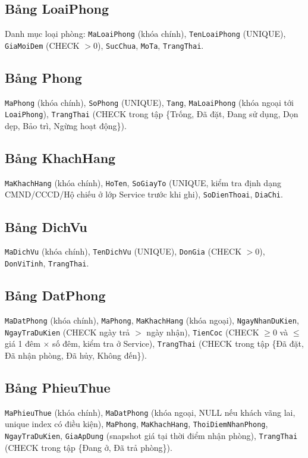 \documentclass[14pt]{report}
\begin{document}
\subsection{Bảng LoaiPhong}
Danh mục loại phòng: \texttt{MaLoaiPhong} (khóa chính), \texttt{TenLoaiPhong} (UNIQUE), \texttt{GiaMoiDem} (CHECK $>0$), \texttt{SucChua}, \texttt{MoTa}, \texttt{TrangThai}.

\subsection{Bảng Phong}
\texttt{MaPhong} (khóa chính), \texttt{SoPhong} (UNIQUE), \texttt{Tang}, \texttt{MaLoaiPhong} (khóa ngoại tới \texttt{LoaiPhong}), \texttt{TrangThai} (CHECK trong tập \{Trống, Đã đặt, Đang sử dụng, Dọn dẹp, Bảo trì, Ngừng hoạt động\}).

\subsection{Bảng KhachHang}
\texttt{MaKhachHang} (khóa chính), \texttt{HoTen}, \texttt{SoGiayTo} (UNIQUE, kiểm tra định dạng CMND/CCCD/Hộ chiếu ở lớp Service trước khi ghi), \texttt{SoDienThoai}, \texttt{DiaChi}.

\subsection{Bảng DichVu}
\texttt{MaDichVu} (khóa chính), \texttt{TenDichVu} (UNIQUE), \texttt{DonGia} (CHECK $>0$), \texttt{DonViTinh}, \texttt{TrangThai}.

\subsection{Bảng DatPhong}
\texttt{MaDatPhong} (khóa chính), \texttt{MaPhong}, \texttt{MaKhachHang} (khóa ngoại), \texttt{NgayNhanDuKien}, \texttt{NgayTraDuKien} (CHECK ngày trả $>$ ngày nhận), \texttt{TienCoc} (CHECK $\ge 0$ và $\le$ giá 1 đêm $\times$ số đêm, kiểm tra ở Service), \texttt{TrangThai} (CHECK trong tập \{Đã đặt, Đã nhận phòng, Đã hủy, Không đến\}).

\subsection{Bảng PhieuThue}
\texttt{MaPhieuThue} (khóa chính), \texttt{MaDatPhong} (khóa ngoại, NULL nếu khách vãng lai, unique index có điều kiện), \texttt{MaPhong}, \texttt{MaKhachHang}, \texttt{ThoiDiemNhanPhong}, \texttt{NgayTraDuKien}, \texttt{GiaApDung} (snapshot giá tại thời điểm nhận phòng), \texttt{TrangThai} (CHECK trong tập \{Đang ở, Đã trả phòng\}).
\end{document}

